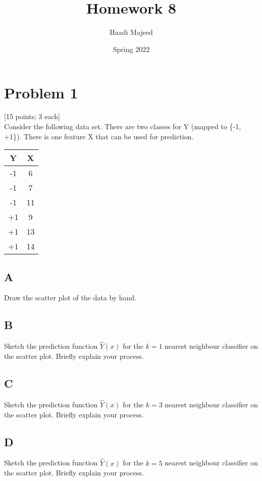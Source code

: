\documentclass[12pt]{article}
\title{ \course \\\large Homework 8 }
\author{ Haadi Majeed }
\date{Spring 2022}
\begin{document}
\maketitle
\pagebreak

\pagebreak
\section{Problem 1}
 [15 points; 3 each]\\
Consider the following data set. There are two classes for
Y (mapped to \{-1, +1\}). There is one feature X that can be used for prediction.
\begin{center}
    \begin{tabular}{ |c|c| }
        \hline
        Y  & X  \\
        \hline
        -1 & 6  \\
        \hline
        -1 & 7  \\
        \hline
        -1 & 11 \\
        \hline
        +1 & 9  \\
        \hline
        +1 & 13 \\
        \hline
        +1 & 14 \\
        \hline
    \end{tabular}
\end{center}
\subsection{A}
Draw the scatter plot of the data by hand.\\

\subsection{B}
Sketch the prediction function $\hat{Y}(x)$ for the $k = 1$ nearest neighbour classifier on the scatter plot. Briefly explain your process.

\subsection{C}
Sketch the prediction function $\hat{Y}(x)$ for the $k = 3$ nearest neighbour classifier on the scatter plot. Briefly explain your process.

\subsection{D}
Sketch the prediction function $\hat{Y}(x)$ for the $k = 5$ nearest neighbour classifier on the scatter plot. Briefly explain your process.
\end{document}
